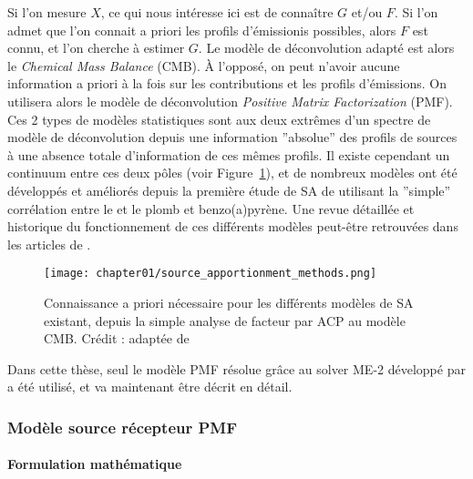 Si l'on mesure $X$, ce qui nous intéresse ici est de connaître $G$ et/ou $F$. Si l'on
admet que l'on connait a priori les profils d'émissionis possibles, alors $F$ est connu, et
l'on cherche à estimer $G$. Le modèle de déconvolution adapté est alors le
\textit{Chemical Mass Balance} (CMB). À l'opposé, on peut n'avoir aucune information a
priori à la fois sur les contributions et les profils d'émissions. On utilisera alors le
modèle de déconvolution \textit{Positive Matrix Factorization} (PMF).  Ces 2 types de
modèles statistiques sont aux deux extrêmes d'un spectre de modèle de déconvolution depuis une
information ''absolue'' des profils de sources à une absence totale d'information de ces
mêmes profils.  Il existe cependant un continuum entre ces deux pôles (voir
Figure~\ref{fig:chapter01/source_apportionment_methods}), et de nombreux modèles ont été
développés et améliorés depuis la première étude de SA de \textcite{colucciAutomotive1965}
utilisant la ''simple'' corrélation entre le  et le plomb et benzo(a)pyrène.  Une
revue détaillée et historique du fonctionnement de ces différents modèles peut-être
retrouvées dans les articles de
\textcite{henryHistory1997,vianaSource2008,belisCritical2013,hopkeReview2016}.

\begin{figure}[ht]
    \centering
    \texttt{[image: chapter01/source\_apportionment\_methods.png]}
    \caption{
        Connaissance a priori nécessaire pour les différents modèles de SA existant,
        depuis la simple analyse de facteur par ACP au modèle CMB. Crédit :
        \textcite{vianaSource2008} adaptée de \textcite{schauerCharacterization2006}
    }%
    \label{fig:chapter01/source_apportionment_methods}
\end{figure}

Dans cette thèse, seul le modèle PMF résolue grâce au solver ME-2 développé par
\textcite{paateroMultilinear1999} a été utilisé, et va maintenant être décrit en détail.

\subsubsection{Modèle source récepteur PMF}%
\label{ssub:pmf}

\paragraph{Formulation mathématique}%
\label{par:formulation_mathématique}

